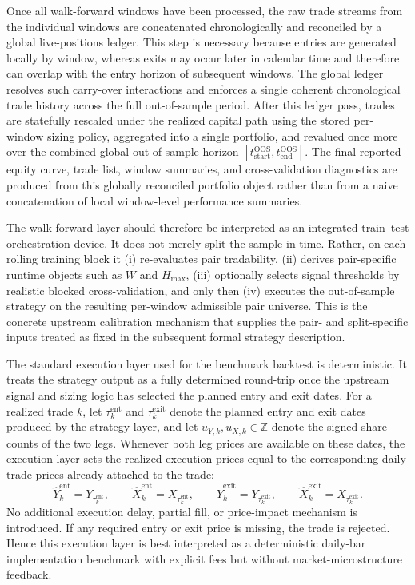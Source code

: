\documentclass[11pt,a4paper]{article}
\begin{document}
Once all walk-forward windows have been processed, the raw trade streams from
the individual windows are concatenated chronologically and reconciled by a
global live-positions ledger. This step is necessary because entries are
generated locally by window, whereas exits may occur later in calendar time and
therefore can overlap with the entry horizon of subsequent windows. The global
ledger resolves such carry-over interactions and enforces a single coherent
chronological trade history across the full out-of-sample period. After this
ledger pass, trades are statefully rescaled under the realized capital path
using the stored per-window sizing policy, aggregated into a single portfolio,
and revalued once more over the combined global out-of-sample horizon
\([t_{\mathrm{start}}^{\mathrm{OOS}}, t_{\mathrm{end}}^{\mathrm{OOS}}]\).
The final reported equity curve, trade list, window summaries, and
cross-validation diagnostics are produced from this globally reconciled
portfolio object rather than from a naive concatenation of local window-level
performance summaries.

The walk-forward layer should therefore be interpreted as an integrated
train--test orchestration device. It does not merely split the sample in time.
Rather, on each rolling training block it (i) re-evaluates pair tradability,
(ii) derives pair-specific runtime objects such as \(W\) and \(H_{\max}\),
(iii) optionally selects signal thresholds by realistic blocked
cross-validation, and only then (iv) executes the out-of-sample strategy on the
resulting per-window admissible pair universe. This is the concrete upstream
calibration mechanism that supplies the pair- and split-specific inputs treated
as fixed in the subsequent formal strategy description.

The standard execution layer used for the benchmark backtest is deterministic. It treats the
strategy output as a fully determined round-trip once the upstream signal and sizing logic has
selected the planned entry and exit dates. For a realized trade \(k\), let
\(\tau^{\mathrm{ent}}_k\) and \(\tau^{\mathrm{exit}}_k\) denote the planned entry and exit dates
produced by the strategy layer, and let \(u_{Y,k}, u_{X,k} \in \mathbb{Z}\) denote the
signed share counts of the two legs. Whenever both leg prices are available on these dates, the
execution layer sets the realized execution prices equal to the corresponding daily trade prices
already attached to the trade:
\[
\hat Y^{\mathrm{ent}}_k = Y_{\tau^{\mathrm{ent}}_k}, \qquad
\hat X^{\mathrm{ent}}_k = X_{\tau^{\mathrm{ent}}_k}, \qquad
\hat Y^{\mathrm{exit}}_k = Y_{\tau^{\mathrm{exit}}_k}, \qquad
\hat X^{\mathrm{exit}}_k = X_{\tau^{\mathrm{exit}}_k}.
\]
No additional execution delay, partial fill, or price-impact mechanism is introduced. If any
required entry or exit price is missing, the trade is rejected. Hence this execution layer is best
interpreted as a deterministic daily-bar implementation benchmark with explicit fees but without
market-microstructure feedback.
\end{document}

